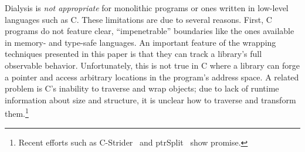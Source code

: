 \documentclass[letterpaper,twocolumn,10pt]{article}
\newcommand{\sx}[1]{(\S\ref{#1})}
\newcommand{\sys}{{\scshape Lya}\xspace}
\begin{document}
% 

Dialysis is \emph{not appropriate} for monolithic programs or ones written in low-level languages such as C.
These limitations are due to several reasons.
First, C programs do not feature clear, ``impenetrable'' boundaries like the ones available in memory- and type-safe languages.
An important feature of the wrapping techniques presented in this paper is that they can track a library's full observable behavior.
Unfortunately, this is not true in C where a library can forge a pointer and access arbitrary locations in the program's address space.
A related problem is C's inability to traverse and wrap objects;
  due to lack of runtime information about size and structure, it is unclear how to traverse and transform them.\footnote{
  Recent efforts such as C-Strider~\cite{saur2016cstrider} and ptrSplit~\cite{ptrsplit:17} show promise.
}

\end{document}
